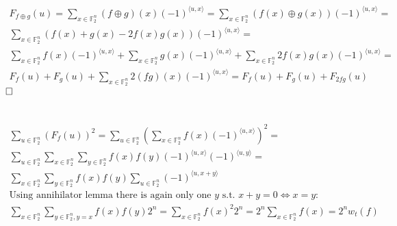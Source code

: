\documentclass[12pt, a4paper]{article}
\newcommand{\qed}{\hfill\square}
\begin{document}
\section{}
\begin{gather*}
F_{f \oplus g}(u) = \sum\limits_{x \in \mathbb{F}^n_2}(f \oplus g)(x)(-1)^{\langle u,x \rangle} = \sum\limits_{x \in \mathbb{F}^n_2}(f(x) \oplus g(x))(-1)^{\langle u,x \rangle} = \\
\sum\limits_{x \in \mathbb{F}^n_2}(f(x) + g(x) - 2f(x)g(x))(-1)^{\langle u,x \rangle} = \\
\sum\limits_{x \in \mathbb{F}^n_2}f(x)(-1)^{\langle u,x \rangle} + \sum\limits_{x \in \mathbb{F}^n_2}g(x)(-1)^{\langle u,x \rangle} + \sum\limits_{x \in \mathbb{F}^n_2}2f(x)g(x)(-1)^{\langle u,x \rangle} = \\
F_f(u) + F_g(u) + \sum\limits_{x \in \mathbb{F}^n_2}2(fg)(x)(-1)^{\langle u,x \rangle} = F_f(u) + F_g(u) + F_{2fg}(u)
\end{gather*}
$\qed$

\section{}
\begin{gather*}
\sum\limits_{u \in \mathbb{F}^n_2} (F_f(u))^2 = \sum\limits_{u \in \mathbb{F}^n_2} \left( \sum\limits_{x \in \mathbb{F}^n_2} f(x)(-1)^{\langle u,x \rangle} \right)^2 =\\
\sum\limits_{u \in \mathbb{F}^n_2} \sum\limits_{x \in \mathbb{F}^n_2} \sum\limits_{y \in \mathbb{F}^n_2} f(x)f(y)(-1)^{\langle u,x \rangle} (-1)^{\langle u,y \rangle}=\\
\sum\limits_{x \in \mathbb{F}^n_2} \sum\limits_{y \in \mathbb{F}^n_2} f(x)f(y) \sum\limits_{u \in \mathbb{F}^n_2} (-1)^{\langle u,x+y \rangle}\\
\text{Using annihilator lemma there is again only one $y$ s.t. $x+y=0 \iff x=y$:}\\
\sum\limits_{x \in \mathbb{F}^n_2} \sum\limits_{y \in \mathbb{F}^n_2, y=x} f(x)f(y)2^n = \sum\limits_{x \in \mathbb{F}^n_2} f(x)^2 2^n = 2^n\sum\limits_{x \in \mathbb{F}^n_2} f(x) = 2^nw_t(f)\\
\end{gather*}
\end{document}

